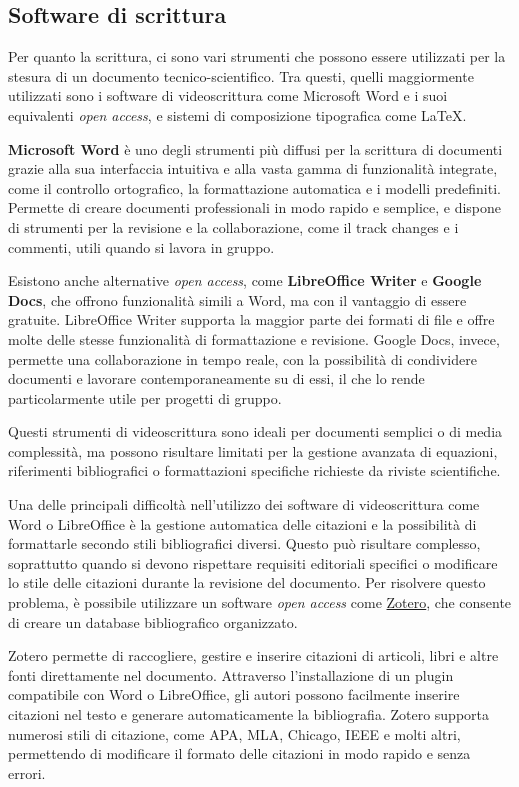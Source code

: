 \documentclass[9pt,a4paper,twoside]{rho-class/rho}
\begin{document}
\subsection{Software di scrittura}
Per quanto la scrittura, ci sono vari strumenti che possono essere utilizzati per la stesura di un documento tecnico-scientifico. Tra questi, quelli maggiormente utilizzati sono i software di videoscrittura come Microsoft Word e i suoi equivalenti \textit{open access}, e sistemi di composizione tipografica come LaTeX.

\textbf{Microsoft Word} è uno degli strumenti più diffusi per la scrittura di documenti grazie alla sua interfaccia intuitiva e alla vasta gamma di funzionalità integrate, come il controllo ortografico, la formattazione automatica e i modelli predefiniti. Permette di creare documenti professionali in modo rapido e semplice, e dispone di strumenti per la revisione e la collaborazione, come il track changes e i commenti, utili quando si lavora in gruppo.

Esistono anche alternative \textit{open access}, come \textbf{LibreOffice Writer} e \textbf{Google Docs}, che offrono funzionalità simili a Word, ma con il vantaggio di essere gratuite. LibreOffice Writer supporta la maggior parte dei formati di file e offre molte delle stesse funzionalità di formattazione e revisione. Google Docs, invece, permette una collaborazione in tempo reale, con la possibilità di condividere documenti e lavorare contemporaneamente su di essi, il che lo rende particolarmente utile per progetti di gruppo.

Questi strumenti di videoscrittura sono ideali per documenti semplici o di media complessità, ma possono risultare limitati per la gestione avanzata di equazioni, riferimenti bibliografici o formattazioni specifiche richieste da riviste scientifiche.

Una delle principali difficoltà nell’utilizzo dei software di videoscrittura come Word o LibreOffice è la gestione automatica delle citazioni e la possibilità di formattarle secondo stili bibliografici diversi. Questo può risultare complesso, soprattutto quando si devono rispettare requisiti editoriali specifici o modificare lo stile delle citazioni durante la revisione del documento. Per risolvere questo problema, è possibile utilizzare un software \textit{open access} come \href{https://www.zotero.org}{Zotero}, che consente di creare un database bibliografico organizzato.

Zotero permette di raccogliere, gestire e inserire citazioni di articoli, libri e altre fonti direttamente nel documento. Attraverso l’installazione di un plugin compatibile con Word o LibreOffice, gli autori possono facilmente inserire citazioni nel testo e generare automaticamente la bibliografia. Zotero supporta numerosi stili di citazione, come APA, MLA, Chicago, IEEE e molti altri, permettendo di modificare il formato delle citazioni in modo rapido e senza errori.
\end{document}
